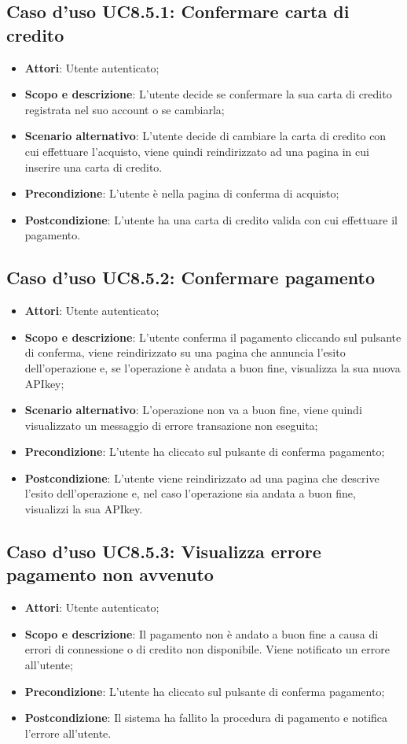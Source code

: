 \documentclass[12pt,a4paper,titlepage]{article}
\begin{document}
	\subsection{Caso d'uso UC8.5.1: Confermare carta di credito}
	\label{UC8.5.1}
	\begin{itemize}
		\item \textbf{Attori}: Utente autenticato;
		\item \textbf{Scopo e descrizione}: L'utente decide se confermare la sua carta di credito registrata nel suo account o se cambiarla;
		\item \textbf{Scenario alternativo}: L'utente decide di cambiare la carta di credito con cui effettuare l'acquisto, viene quindi reindirizzato ad una pagina in cui inserire una carta di credito.
		\item \textbf{Precondizione}: L'utente è nella pagina di conferma di acquisto;
		\item \textbf{Postcondizione}: L'utente ha una carta di credito valida con cui effettuare il pagamento.
	\end{itemize}
	\subsection{Caso d'uso UC8.5.2: Confermare pagamento}
	\label{UC8.5.2}
	\begin{itemize}
		\item \textbf{Attori}: Utente autenticato;
		\item \textbf{Scopo e descrizione}: L'utente conferma il pagamento cliccando sul pulsante di conferma, viene reindirizzato su una pagina che annuncia l'esito dell'operazione e, se l'operazione è andata a buon fine, visualizza la sua nuova APIkey;
		\item \textbf{Scenario alternativo}: L'operazione non va a buon fine, viene quindi visualizzato un messaggio di errore transazione non eseguita;
		\item \textbf{Precondizione}: L'utente ha cliccato sul pulsante di conferma pagamento;
		\item \textbf{Postcondizione}: L'utente viene reindirizzato ad una pagina che descrive l'esito dell'operazione e, nel caso l'operazione sia andata a buon fine, visualizzi la sua APIkey.
	\end{itemize}
	\subsection{Caso d'uso UC8.5.3: Visualizza errore pagamento non avvenuto}
	\label{UC8.5.3}
	\begin{itemize}
		\item \textbf{Attori}: Utente autenticato;
		\item \textbf{Scopo e descrizione}: Il pagamento non è andato a buon fine a causa di errori di connessione o di credito non disponibile. Viene notificato un errore all'utente;
		\item \textbf{Precondizione}: L'utente ha cliccato sul pulsante di conferma pagamento;
		\item \textbf{Postcondizione}: Il sistema ha fallito la procedura di pagamento e notifica l'errore all'utente.
	\end{itemize}
\end{document}
